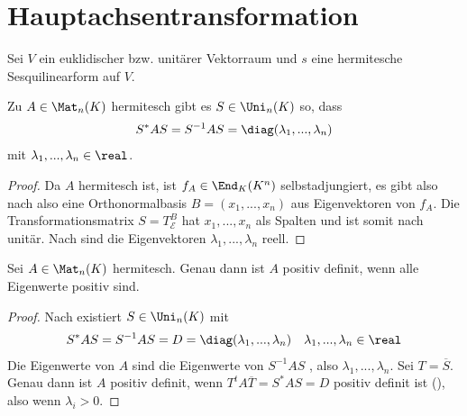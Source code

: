 \section{Hauptachsentransformation}

Sei $V$ ein euklidischer bzw. unitärer Vektorraum und $s$ eine hermitesche Sesquilinearform auf $V$.

\begin{proposition}
	Zu $A\in\Mat_n(K)$ hermitesch gibt es $S\in\Uni_n(K)$ so, dass
	\begin{align}
		S^*AS=S^{-1}AS=\diag(\lambda_1,...,\lambda_n)\notag
	\end{align}
	mit $\lambda_1,...,\lambda_n\in\real$.
\end{proposition}
\begin{proof}
	Da $A$ hermitesch ist, ist $f_A\in\End_K(K^n)$ selbstadjungiert, es gibt also nach  also eine Orthonormalbasis $B=(x_1,...,x_n)$ aus Eigenvektoren von $f_A$. Die Transformationsmatrix $S=T^B_{\mathcal{E}}$ hat $x_1,...,x_n$ als Spalten und ist somit nach  unitär. Nach  sind die Eigenvektoren $\lambda_1,...,\lambda_n$ reell.
\end{proof}

\begin{conclusion}
	Sei $A\in\Mat_n(K)$ hermitesch. Genau dann ist $A$ positiv definit, wenn alle Eigenwerte positiv sind.
\end{conclusion}
\begin{proof}
	Nach  existiert $S\in\Uni_n(K)$ mit 
	\begin{align}
	S^*AS=S^{-1}AS=D=\diag(\lambda_1,...,\lambda_n)\quad \lambda_1,...,\lambda_n\in\real\notag
	\end{align}
	Die Eigenwerte von $A$ sind die Eigenwerte von $S^{-1}AS$
	, also $\lambda_1,...,\lambda_n$. Sei $T=\overline{S}$. Genau dann ist $A$ positiv definit, wenn $T^tA\overline{T}=S^*AS=D$ positiv definit ist (), also wenn $\lambda_i>0$.
\end{proof}

